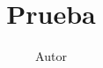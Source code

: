 \documentclass{article}
\begin{document}
\author{Autor}
\title{Prueba}
\maketitle
\lipsum[1-12]
\end{document}
